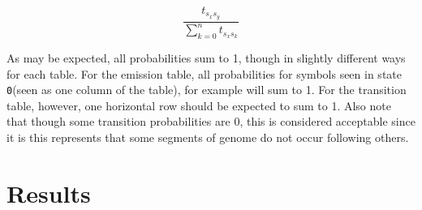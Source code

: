 \documentclass[a4paper,11pt]{article}
\begin{document}
\begin{equation}
    \frac{t_{s_{x}s_{y}}}{\sum_{k = 0}^{n} t_{s_{x}s_{k}}}
\end{equation}

As may be expected, all probabilities sum to 1, though in slightly different ways for each table. For the emission table, all probabilities for symbols seen in state \verb+0+(seen as one column of the table), for example will sum to 1. For the transition table, however, one horizontal row should be expected to sum to 1. Also note that though some transition probabilities are 0, this is considered acceptable since it is this represents that some segments of genome do not occur following others.

\section{Results}
\end{document}

